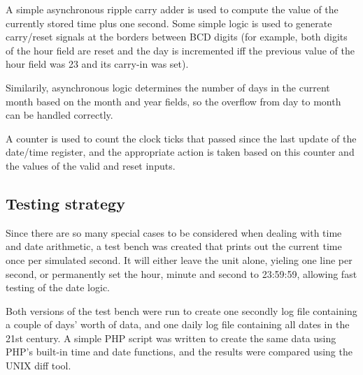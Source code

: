 \documentclass[a4paper]{article}
\begin{document}
A simple asynchronous ripple carry adder is used to compute the value of the
currently stored time plus one second. Some simple logic is used to generate
carry/reset signals at the borders between BCD digits (for example, both digits
of the hour field are reset and the day is incremented iff the previous value
of the hour field was 23 and its carry-in was set).

Similarily, asynchronous logic determines the number of days in the current
month based on the month and year fields, so the overflow from day to month can
be handled correctly.

A counter is used to count the clock ticks that passed since the last update of
the date/time register, and the appropriate action is taken based on this
counter and the values of the valid and reset inputs.

\subsection{Testing strategy}

Since there are so many special cases to be considered when dealing with time
and date arithmetic, a test bench was created that prints out the current time
once per simulated second. It will either leave the unit alone, yieling one
line per second, or permanently set the hour, minute and second to 23:59:59,
allowing fast testing of the date logic.

Both versions of the test bench were run to create one secondly log file
containing a couple of days' worth of data, and one daily log file containing
all dates in the 21st century. A simple PHP script was written to create the
same data using PHP's built-in time and date functions, and the results were
compared using the UNIX diff tool.
\end{document}
